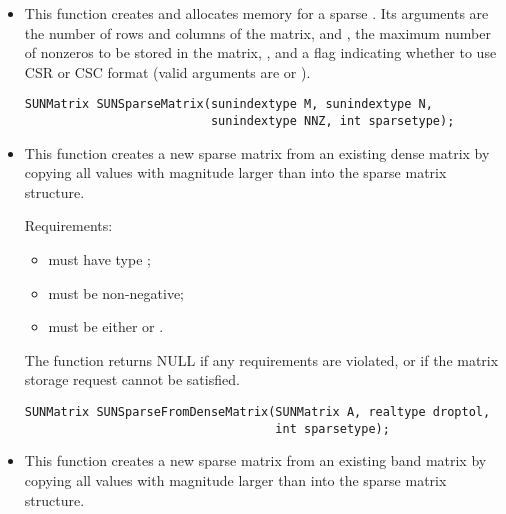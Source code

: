 \begin{itemize}


\item {}

  This function creates and allocates memory for a sparse .
  Its arguments are the number of rows and columns of the
  matrix,  and , the maximum number of nonzeros to be
  stored in the matrix, , and a flag 
  indicating whether to use CSR or CSC format (valid arguments
  are  or ). 

  \begin{verbatim}
SUNMatrix SUNSparseMatrix(sunindextype M, sunindextype N,
                          sunindextype NNZ, int sparsetype);
  \end{verbatim}


\item {}

  This function creates a new sparse matrix from an existing dense
  matrix by copying all values with magnitude larger than 
  into the sparse matrix structure.

  Requirements:
  \begin{itemize}
  \item {} must have type ;
  \item {} must be non-negative;
  \item {} must be either  or .
  \end{itemize}
  The function returns NULL if any requirements are violated, or if
  the matrix storage request cannot be satisfied. 

  \begin{verbatim}
SUNMatrix SUNSparseFromDenseMatrix(SUNMatrix A, realtype droptol,
                                   int sparsetype);
  \end{verbatim}


\item {}

  This function creates a new sparse matrix from an existing band
  matrix by copying all values with magnitude larger than 
  into the sparse matrix structure.


\end{itemize}
